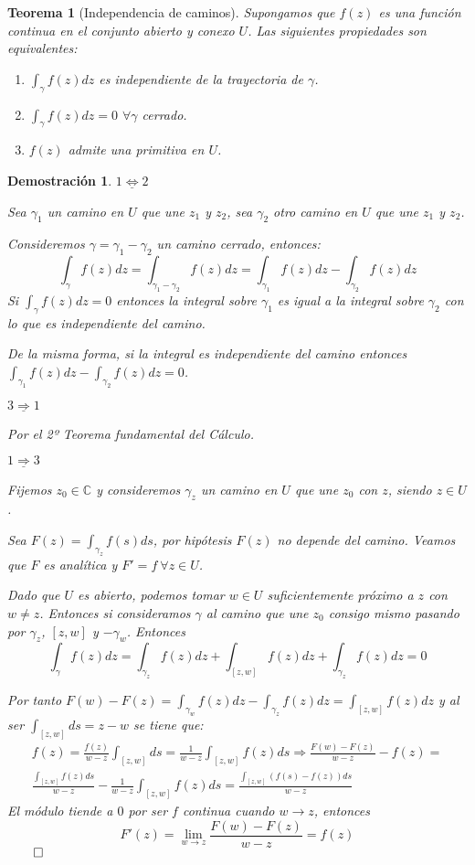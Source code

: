 \documentclass[12pt]{book}
\newtheorem{theorem}{Teorema}[chapter]
\newtheorem*{dem}{Demostración}
\newcommand{\C}{\mathbb{C}}
\begin{document}
\begin{theorem}[Independencia de caminos]
Supongamos que $f(z)$ es una función continua en el conjunto abierto y conexo $U$. Las siguientes propiedades son equivalentes:
\begin{enumerate}
\item $\displaystyle\int_{\gamma}f(z)dz$ es independiente de la trayectoria de $\gamma$.
\item  $\displaystyle\int_{\gamma}f(z)dz = 0$ $\forall \gamma$ cerrado.
\item $f(z)$ admite una primitiva en $U$.
\end{enumerate}
\end{theorem}


\begin{dem}
$\underline{1 \Leftrightarrow 2}$

Sea $\gamma_1$ un camino en $U$ que une $z_1$ y $z_2$, sea $\gamma_2$ otro camino en $U$ que une $z_1$ y $z_2$.

Consideremos $\gamma = \gamma_1 -\gamma_2$ un camino cerrado, entonces:
$$\int_\gamma f(z)dz = \int_{\gamma_1 -\gamma_2} f(z)dz = \int_{\gamma_1} f(z)dz - \int_{\gamma_2} f(z)dz$$
Si $\int_\gamma f(z)dz = 0$ entonces la integral sobre $\gamma_1$ es igual a la integral sobre $\gamma_2$ con lo que es independiente del camino.

De la misma forma, si la integral es independiente del camino entonces $\displaystyle\int_{\gamma_1} f(z)dz - \int_{\gamma_2} f(z)dz = 0$.

$\underline{3 \Rightarrow 1}$

Por el 2º Teorema fundamental del Cálculo.

$\underline{1 \Rightarrow 3}$

Fijemos $z_0 \in \C$ y consideremos $\gamma_z$ un camino en $U$ que une $z_0$ con $z$, siendo $z \in U$.

Sea $F(z) = \int_{\gamma_z}f(s)ds$, por hipótesis $F(z)$ no depende del camino. Veamos que $F$ es analítica y $F'=f \ \forall z \in U$.

Dado que $U$ es abierto, podemos tomar $w\in U$ suficientemente próximo a $z$ con $w\neq z$. Entonces si consideramos $\gamma$ al camino que une $z_0$ consigo mismo pasando por $\gamma_z$, $[z,w]$ y $-\gamma_w$. Entonces
$$
\int_\gamma f(z)dz = \int_{\gamma_z} f(z)dz + \int_{[z,w]} f(z)dz + \int_{\gamma_z} f(z)dz = 0
$$ 

Por tanto $F(w)-F(z) = \int_{\gamma_w} f(z)dz - \int_{\gamma_z} f(z)dz = \int_{[z,w]} f(z)dz$ y al ser $\int_{[z,w]} ds = z-w$ se tiene que:
\begin{multline*}
f(z) = \frac{f(z)}{w-z}\int_{[z,w]}ds= \frac{1}{w-z}\int_{[z,w]}f(z)ds \Rightarrow \frac{F(w)-F(z)}{w-z}-f(z) =\\
\frac{\int_{[z,w]}f(z)ds}{w-z}-\frac{1}{w-z}\int_{[z,w]}f(z)ds = \frac{\int_{[z,w]}(f(s)-f(z))ds}{w-z}
\end{multline*}
El módulo tiende a $0$ por ser $f$ continua cuando $w \to z$, entonces 
$$F'(z) = \lim_{w\to z}\frac{F(w)-F(z)}{w-z} = f(z)$$
$\qed$

\end{dem}
\end{document}
